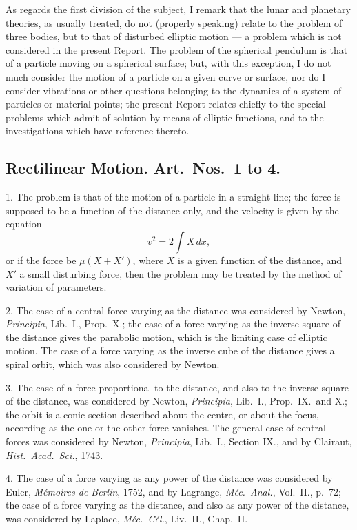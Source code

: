 \documentclass[11pt,a4paper]{book}
\begin{document}
\newpage
\setcounter{page}{514}

As regards the first division of the subject, I remark that the lunar and planetary theories, as usually treated, do not (properly speaking) relate to the problem of three bodies, but to that of disturbed elliptic motion --- a problem which is not considered in the present Report. The problem of the spherical pendulum is that of a particle moving on a spherical surface; but, with this exception, I do not much consider the motion of a particle on a given curve or surface, nor do I consider vibrations or other questions belonging to the dynamics of a system of particles or material points; the present Report relates chiefly to the special problems which admit of solution by means of elliptic functions, and to the investigations which have reference thereto.

\subsection*{Rectilinear Motion. Art.\ Nos.\ 1 to 4.}

1. The problem is that of the motion of a particle in a straight line; the force is supposed to be a function of the distance only, and the velocity is given by the equation
\[
v^2 = 2\int X\,dx,
\]
or if the force be $\mu(X + X')$, where $X$ is a given function of the distance, and $X'$ a small disturbing force, then the problem may be treated by the method of variation of parameters.

\newpage
\setcounter{page}{515}

2. The case of a central force varying as the distance was considered by Newton, \textit{Principia}, Lib.\ I., Prop.\ X.; the case of a force varying as the inverse square of the distance gives the parabolic motion, which is the limiting case of elliptic motion. The case of a force varying as the inverse cube of the distance gives a spiral orbit, which was also considered by Newton.

3. The case of a force proportional to the distance, and also to the inverse square of the distance, was considered by Newton, \textit{Principia}, Lib.\ I., Prop.\ IX.\ and X.; the orbit is a conic section described about the centre, or about the focus, according as the one or the other force vanishes. The general case of central forces was considered by Newton, \textit{Principia}, Lib.\ I., Section IX., and by Clairaut, \textit{Hist.\ Acad.\ Sci.}, 1743.

4. The case of a force varying as any power of the distance was considered by Euler, \textit{M\'emoires de Berlin}, 1752, and by Lagrange, \textit{M\'ec.\ Anal.}, Vol.\ II., p.~72; the case of a force varying as the distance, and also as any power of the distance, was considered by Laplace, \textit{M\'ec.\ C\'el.}, Liv.\ II., Chap.\ II.
\end{document}

